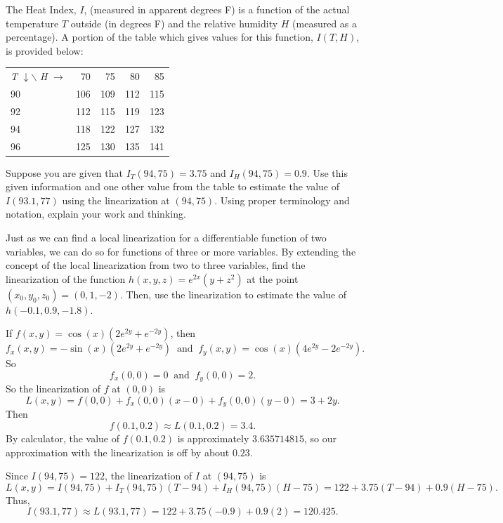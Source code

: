 \begin{exercises}
	\item The Heat Index, $I$, (measured in apparent degrees F) is a function of the actual temperature $T$ outside (in degrees F) and the relative humidity $H$ (measured as a percentage).  A portion of the table which gives values for this function, $I(T,H)$, is provided below:
\begin{center}
\begin{tabular}{|l||r|r|r|r|} \hline
\emph{T} $\downarrow \backslash$ \emph{H} $\rightarrow$ & 70 &	75 & 80 &	85  \\ \hhline{|=|=|=|=|=|}
90 & 106 & 109 & 112 & 115  \\ \hline
92 & 112 & 115 & 119 & 123  \\ \hline
94 & 118 & 122 & 127 & 132  \\ \hline
96 & 125 & 130 & 135 & 141  \\ \hline
\end{tabular}
\end{center}
Suppose you are given that $I_T(94,75) = 3.75$ and $I_H(94,75) = 0.9$.  Use this given information and one other value from the table to estimate the value of $I(93.1,77)$ using the linearization at $(94,75)$.  Using proper terminology and notation, explain your work and thinking.
	\item Just as we can find a local linearization for a differentiable function of two variables, we can do so for functions of three or more variables.  By extending the concept of the local linearization from two to three variables, find the linearization of the function $h(x,y,z) =
  e^{2x}(y+z^2)$ at the point $(x_0,y_0,z_0) = (0, 1, -2)$.  Then, use the
  linearization to estimate the value of $h(-0.1, 0.9, -1.8)$.
    \ea

\begin{exerciseSolution}
    \ba
   	\item If $f(x,y) = \cos(x)(2e^{2y}+e^{-2y})$, then
\[f_x(x,y) = -\sin(x)(2e^{2y}+e^{-2y}) \ \text{ and } \ f_y(x,y) = \cos(x)\left(4e^{2y} - 2e^{-2y}\right).\]
So
\[f_x(0,0) = 0 \ \text{ and } \ f_y(0,0) = 2.\]
So the linearization of $f$ at $(0,0)$ is 
\[L(x,y) = f(0,0) + f_x(0,0)(x-0)+f_y(0,0)(y-0) = 3+2y.\]
Then
\[f(0.1,0.2) \approx L(0.1,0.2) = 3.4.\]
By calculator, the value of $f(0.1,0.2)$ is approximately $3.635714815$, so our approximation with the linearization is off by about $0.23$.

	\item Since $I(94,75) = 122$, the linearization of $I$ at $(94,75)$ is 
\[L(x,y) = I(94,75) + I_T(94,75)(T-94) + I_H(94,75)(H-75) = 122 + 3.75(T-94) + 0.9(H-75).\]
Thus,
\[I(93.1,77) \approx L(93.1,77) = 122 + 3.75(-0.9) + 0.9(2) = 120.425.\]


\end{exerciseSolution}
\end{exercises}
